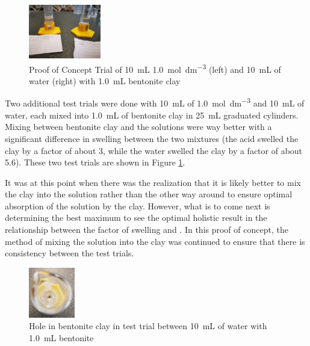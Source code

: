 \documentclass[11pt, letterpaper]{article}
\begin{document}
\begin{figure}
    \begin{center}
        \includegraphics[width=0.28\textwidth]{betterPOC.jpg}
    \end{center}
    \caption{Proof of Concept Trial of \SI{10}{mL} \SI{1.0}{mol.dm^{-3}}  (left) and \SI{10}{mL} of water (right) with \SI{1.0}{mL} bentonite clay}
    \label{fig:betterPOC}
\end{figure}

Two additional test trials were done with \SI{10}{mL} of
\SI{1.0}{mol.dm^{-3}}  and \SI{10}{mL} of water,
each mixed into \SI{1.0}{mL} of bentonite clay in
\SI{25}{mL} graduated cylinders. Mixing between
bentonite clay and the solutions were way better with a
significant difference in swelling between the two mixtures
(the acid swelled the clay by a factor of about 3, while
the water swelled the clay by a factor of about 5.6).
These two test trials are shown in Figure \ref*{fig:betterPOC}.

It was at this point when there was the realization that it
is likely better to mix the clay into the solution rather than
the other way around to ensure optimal absorption of the solution
by the clay. However, what is to come next is determining the
best maximum \ce{[H+]} to see the optimal holistic result
in the relationship between the factor of swelling and \ce{[H+]}.
In this proof of concept, the method of mixing the solution
into the clay was continued to ensure that there is consistency
between the test trials.

\begin{figure}
    \begin{center}
        \includegraphics[width=0.18\textwidth]{hole.jpg}
    \end{center}
    \caption{Hole in bentonite clay in test trial between \SI{10}{mL} of water with \SI{1.0}{mL} bentonite}
    \label{fig:hole}
\end{figure}
\end{document}
